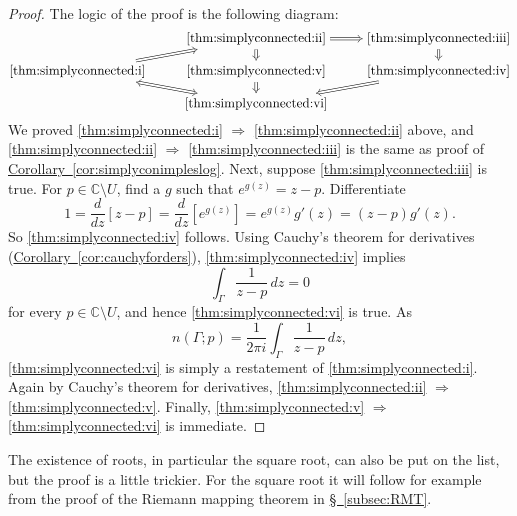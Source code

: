 \documentclass[12pt,openany]{book}
\newcommand{\C}{{\mathbb{C}}}
\theoremstyle{plain}
\theoremstyle{remark}
\theoremstyle{definition}
\theoremstyle{exercise}
\theoremstyle{example}
\newcommand{\subsectionref}[1]{\hyperref[#1]{\S~\ref*{#1}}}
\newcommand{\corref}[1]{\hyperref[#1]{Corollary~\ref*{#1}}}
\begin{document}
\begin{proof}
The logic of the proof is the following diagram:
\begin{equation*}
\begin{tikzcd}[cramped, row sep=small]
& \text{\ref{thm:simplyconnected:ii}} \arrow[d, Rightarrow] \arrow[r, Rightarrow] &
\text{\ref{thm:simplyconnected:iii}} \arrow[d, Rightarrow] \\
\text{\ref{thm:simplyconnected:i}} \arrow[ur, Rightarrow] & 
\text{\ref{thm:simplyconnected:v}} \arrow[d, Rightarrow] &
\text{\ref{thm:simplyconnected:iv}} \arrow[dl, Rightarrow] \\
& \text{\ref{thm:simplyconnected:vi}} \arrow[ul, Leftrightarrow] &
\end{tikzcd}
\end{equation*}
We proved
\ref{thm:simplyconnected:i} $\Rightarrow$
\ref{thm:simplyconnected:ii} above,
and
\ref{thm:simplyconnected:ii} $\Rightarrow$
\ref{thm:simplyconnected:iii}
is the same as proof of \corref{cor:simplyconimpleslog}.
Next, suppose \ref{thm:simplyconnected:iii} is true.  For
$p \in \C \setminus U$, find a $g$ such that
$e^{g(z)} = z-p$.
Differentiate
\begin{equation*}
1 = 
\frac{d}{dz} \left[
z-p
\right]
=
\frac{d}{dz} \left[
e^{g(z)}
\right]
=
e^{g(z)} g'(z)
=
(z-p) g'(z) .
\end{equation*}
So \ref{thm:simplyconnected:iv} follows.
Using Cauchy's theorem for derivatives (\corref{cor:cauchyforders}),
\ref{thm:simplyconnected:iv} implies
\begin{equation*}
\int_\Gamma \frac{1}{z-p} \, dz = 0 
\end{equation*}
for every $p \in \C \setminus U$,
and hence 
\ref{thm:simplyconnected:vi} is true.
As 
\begin{equation*}
n(\Gamma;p) = 
\frac{1}{2\pi i}
\int_\Gamma \frac{1}{z-p} \, dz ,
\end{equation*}
\ref{thm:simplyconnected:vi} is simply a restatement of
\ref{thm:simplyconnected:i}.
Again by Cauchy's theorem for derivatives,
\ref{thm:simplyconnected:ii} $\Rightarrow$
\ref{thm:simplyconnected:v}.
Finally, \ref{thm:simplyconnected:v} $\Rightarrow$
\ref{thm:simplyconnected:vi} is immediate.
\end{proof}

The existence of roots, in particular the square root, can also be put on
the list, but the proof is a little trickier.  For the square root it will follow
for example from the proof of the Riemann mapping theorem in 
\subsectionref{subsec:RMT}.
\end{document}
